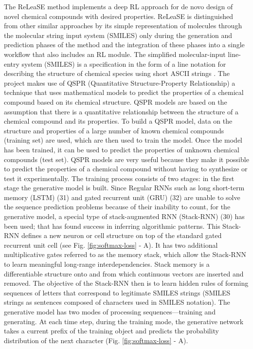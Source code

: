 \documentclass[a4paper]{article}
\begin{document}
The ReLeaSE method implements a deep RL approach for de novo design of novel chemical compounds with desired properties. ReLeaSE is distinguished from other similar approaches by its simple representation of molecules through the molecular string input system (SMILES) only during the generation and prediction phases of the method and the integration of these phases into a single workflow that also includes an RL module. 
The simplified molecular-input line-entry system (SMILES) is a specification in the form of a line notation for describing the structure of chemical species using short ASCII strings \cite{simplified-molecular-input-line-entry-system}. 
The project makes use of QSPR (Quantitative Structure-Property Relationship) a technique that uses mathematical models to predict the properties of a chemical compound based on its chemical structure. QSPR models are based on the assumption that there is a quantitative relationship between the structure of a chemical compound and its properties. To build a QSPR model, data on the structure and properties of a large number of known chemical compounds (training set) are used, which are then used to train the model. Once the model has been trained, it can be used to predict the properties of unknown chemical compounds (test set). QSPR models are very useful because they make it possible to predict the properties of a chemical compound without having to synthesize or test it experimentally.
The training process consists of two stages: in the first stage the generative model is built.
Since Regular RNNs such as long short-term memory (LSTM) (31) and gated recurrent unit (GRU) (32) are unable to solve the sequence prediction problems because of their
inability to count, for the generative model, a special type of stack-augmented RNN (Stack-RNN) (30) has been used; that has found success in inferring algorithmic patterns. This Stack-RNN defines a new neuron or cell structure on top of the standard gated recurrent unit \cite{arxiv} cell (see Fig. \ref{fig:softmax-loss} - A). It has two additional multiplicative gates referred to as the memory stack, which allow the Stack-RNN to learn meaningful long-range interdependencies. Stack memory is a differentiable structure onto and from which continuous vectors are inserted and removed. The objective of the Stack-RNN then is to learn hidden rules of forming sequences of letters that correspond to legitimate SMILES strings (SMILES strings as sentences
composed of characters used in SMILES notation).
The generative model has two modes of processing sequences—training and generating.  
At each time step, during the training mode, the generative network takes a current prefix of the training object and predicts the probability distribution of the next character (Fig. \ref{fig:softmax-loss} - A). 
\end{document}
